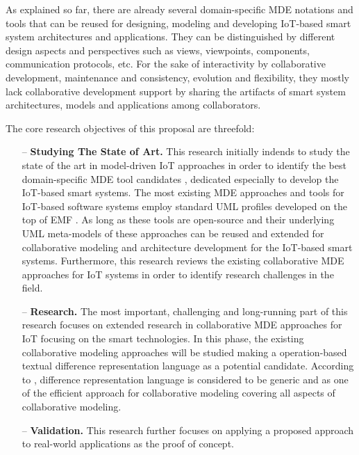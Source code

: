As explained so far, there are already several domain-specific MDE notations and tools that can be reused for designing, modeling and developing IoT-based smart system architectures and applications. They can be distinguished by different design aspects and perspectives such as views, viewpoints, components, communication protocols, etc. For the sake of interactivity by collaborative development, maintenance and consistency, evolution and flexibility, they mostly lack collaborative development support by sharing the artifacts of smart system architectures, models and applications among collaborators. 

The core research objectives of this proposal are threefold:
\begin{itemize}
\item[--] \textbf{Studying The State of Art.} This research initially indends to study the state of the art in model-driven IoT approaches in order to identify the best domain-specific MDE tool candidates \cite{Fleurey+2011}, \cite{Corredor+2012} dedicated especially to develop the IoT-based smart systems. The most existing MDE approaches and tools for IoT-based software systems employ standard UML profiles developed on the top of EMF \cite{Steinberg+2008}. As long as these tools are open-source and their underlying UML meta-models of these approaches can be reused and extended for collaborative modeling and architecture development for the IoT-based smart systems. Furthermore, this research reviews the existing collaborative MDE approaches for IoT systems in order to identify research challenges in the field. 
\item[--] \textbf{Research.} The most important, challenging and long-running part of this research focuses on extended research in collaborative MDE approaches for IoT focusing on the smart technologies. In this phase, the existing collaborative modeling approaches will be studied making a operation-based textual difference representation language \cite{Kuryazov+2018} as a potential candidate. According to \cite{Kuryazov+2018}, difference representation language is considered to be generic and as one of the efficient approach for collaborative modeling covering all aspects of collaborative modeling.
\item[--] \textbf{Validation.} This research further focuses on applying a proposed approach to real-world applications as the proof of concept.
\end{itemize}

 